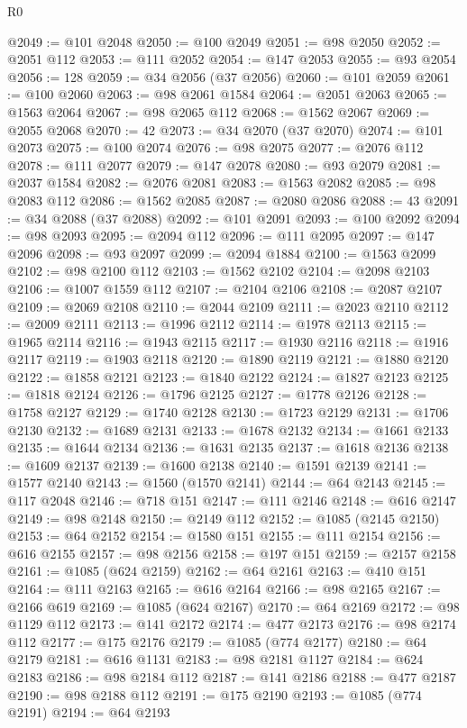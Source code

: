 \begin{lexlean}{R0}
\begin{coremodule}
@2049 := @101 @2048
@2050 := @100 @2049
@2051 := @98 @2050
@2052 := @2051 @112
@2053 := @111 @2052
@2054 := @147 @2053
@2055 := @93 @2054
@2056 := 128
@2059 := @34 @2056 (@37 @2056)
@2060 := @101 @2059
@2061 := @100 @2060
@2063 := @98 @2061 @1584
@2064 := @2051 @2063
@2065 := @1563 @2064
@2067 := @98 @2065 @112
@2068 := @1562 @2067
@2069 := @2055 @2068
@2070 := 42
@2073 := @34 @2070 (@37 @2070)
@2074 := @101 @2073
@2075 := @100 @2074
@2076 := @98 @2075
@2077 := @2076 @112
@2078 := @111 @2077
@2079 := @147 @2078
@2080 := @93 @2079
@2081 := @2037 @1584
@2082 := @2076 @2081
@2083 := @1563 @2082
@2085 := @98 @2083 @112
@2086 := @1562 @2085
@2087 := @2080 @2086
@2088 := 43
@2091 := @34 @2088 (@37 @2088)
@2092 := @101 @2091
@2093 := @100 @2092
@2094 := @98 @2093
@2095 := @2094 @112
@2096 := @111 @2095
@2097 := @147 @2096
@2098 := @93 @2097
@2099 := @2094 @1884
@2100 := @1563 @2099
@2102 := @98 @2100 @112
@2103 := @1562 @2102
@2104 := @2098 @2103
@2106 := @1007 @1559 @112
@2107 := @2104 @2106
@2108 := @2087 @2107
@2109 := @2069 @2108
@2110 := @2044 @2109
@2111 := @2023 @2110
@2112 := @2009 @2111
@2113 := @1996 @2112
@2114 := @1978 @2113
@2115 := @1965 @2114
@2116 := @1943 @2115
@2117 := @1930 @2116
@2118 := @1916 @2117
@2119 := @1903 @2118
@2120 := @1890 @2119
@2121 := @1880 @2120
@2122 := @1858 @2121
@2123 := @1840 @2122
@2124 := @1827 @2123
@2125 := @1818 @2124
@2126 := @1796 @2125
@2127 := @1778 @2126
@2128 := @1758 @2127
@2129 := @1740 @2128
@2130 := @1723 @2129
@2131 := @1706 @2130
@2132 := @1689 @2131
@2133 := @1678 @2132
@2134 := @1661 @2133
@2135 := @1644 @2134
@2136 := @1631 @2135
@2137 := @1618 @2136
@2138 := @1609 @2137
@2139 := @1600 @2138
@2140 := @1591 @2139
@2141 := @1577 @2140
@2143 := @1560 (@1570 @2141)
@2144 := @64 @2143
@2145 := @117 @2048
@2146 := @718 @151
@2147 := @111 @2146
@2148 := @616 @2147
@2149 := @98 @2148
@2150 := @2149 @112
@2152 := @1085 (@2145 @2150)
@2153 := @64 @2152
@2154 := @1580 @151
@2155 := @111 @2154
@2156 := @616 @2155
@2157 := @98 @2156
@2158 := @197 @151
@2159 := @2157 @2158
@2161 := @1085 (@624 @2159)
@2162 := @64 @2161
@2163 := @410 @151
@2164 := @111 @2163
@2165 := @616 @2164
@2166 := @98 @2165
@2167 := @2166 @619
@2169 := @1085 (@624 @2167)
@2170 := @64 @2169
@2172 := @98 @1129 @112
@2173 := @141 @2172
@2174 := @477 @2173
@2176 := @98 @2174 @112
@2177 := @175 @2176
@2179 := @1085 (@774 @2177)
@2180 := @64 @2179
@2181 := @616 @1131
@2183 := @98 @2181 @1127
@2184 := @624 @2183
@2186 := @98 @2184 @112
@2187 := @141 @2186
@2188 := @477 @2187
@2190 := @98 @2188 @112
@2191 := @175 @2190
@2193 := @1085 (@774 @2191)
@2194 := @64 @2193

\end{coremodule}
\end{lexlean}
